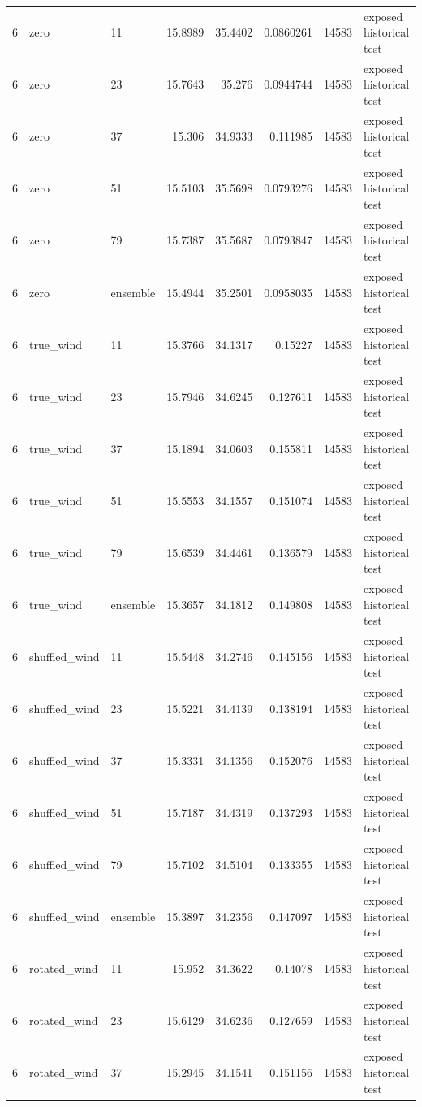 \begin{tabular}{rllrrrrl}
6 & zero & 11 & 15.8989 & 35.4402 & 0.0860261 & 14583 & exposed historical test \\
6 & zero & 23 & 15.7643 & 35.276 & 0.0944744 & 14583 & exposed historical test \\
6 & zero & 37 & 15.306 & 34.9333 & 0.111985 & 14583 & exposed historical test \\
6 & zero & 51 & 15.5103 & 35.5698 & 0.0793276 & 14583 & exposed historical test \\
6 & zero & 79 & 15.7387 & 35.5687 & 0.0793847 & 14583 & exposed historical test \\
6 & zero & ensemble & 15.4944 & 35.2501 & 0.0958035 & 14583 & exposed historical test \\
6 & true\_wind & 11 & 15.3766 & 34.1317 & 0.15227 & 14583 & exposed historical test \\
6 & true\_wind & 23 & 15.7946 & 34.6245 & 0.127611 & 14583 & exposed historical test \\
6 & true\_wind & 37 & 15.1894 & 34.0603 & 0.155811 & 14583 & exposed historical test \\
6 & true\_wind & 51 & 15.5553 & 34.1557 & 0.151074 & 14583 & exposed historical test \\
6 & true\_wind & 79 & 15.6539 & 34.4461 & 0.136579 & 14583 & exposed historical test \\
6 & true\_wind & ensemble & 15.3657 & 34.1812 & 0.149808 & 14583 & exposed historical test \\
6 & shuffled\_wind & 11 & 15.5448 & 34.2746 & 0.145156 & 14583 & exposed historical test \\
6 & shuffled\_wind & 23 & 15.5221 & 34.4139 & 0.138194 & 14583 & exposed historical test \\
6 & shuffled\_wind & 37 & 15.3331 & 34.1356 & 0.152076 & 14583 & exposed historical test \\
6 & shuffled\_wind & 51 & 15.7187 & 34.4319 & 0.137293 & 14583 & exposed historical test \\
6 & shuffled\_wind & 79 & 15.7102 & 34.5104 & 0.133355 & 14583 & exposed historical test \\
6 & shuffled\_wind & ensemble & 15.3897 & 34.2356 & 0.147097 & 14583 & exposed historical test \\
6 & rotated\_wind & 11 & 15.952 & 34.3622 & 0.14078 & 14583 & exposed historical test \\
6 & rotated\_wind & 23 & 15.6129 & 34.6236 & 0.127659 & 14583 & exposed historical test \\
6 & rotated\_wind & 37 & 15.2945 & 34.1541 & 0.151156 & 14583 & exposed historical test \\

\end{tabular}
